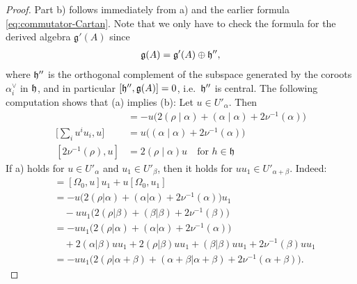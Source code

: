\documentclass[12pt]{article}
\begin{document}
\begin{proof}
    Part b) follows immediately from a) and the earlier formula \ref{eq:commutator-Cartan}. Note that we only have to check the formula for the derived algebra $\mathfrak{g}'(A)$ since \begin{align*}
        \mathfrak{g}(A) = \mathfrak{g}'(A) \oplus \mathfrak{h}'',
    \end{align*} where $\mathfrak{h}''$ is the orthogonal complement of the subspace generated by the coroots $\alpha_i^\vee$ in $\mathfrak{h}$, and in particular $[\mathfrak{h}'',\mathfrak{g}(A)]=0$, i.e.\ $\mathfrak{h}''$ is central.
    The following computation shows that (a) implies (b): Let $u \in U'_\alpha$. Then
    \begin{align*}
        [\Omega_0,u]                & = -u\big(2(\rho \mid \alpha) + (\alpha \mid \alpha) + 2\nu^{-1}(\alpha)\big) \\
        \Big[\sum_i u^i u_i, u\Big] & = u\big((\alpha \mid \alpha) + 2\nu^{-1}(\alpha)\big)                        \\
        [2\nu^{-1}(\rho),u]         & = 2(\rho \mid \alpha)u \quad \text{for } h \in \mathfrak{h}
    \end{align*}
    If a) holds for $u \in U'_\alpha$ and $u_1 \in U'_\beta$, then it holds for $uu_1 \in U'_{\alpha+\beta}$. Indeed:
    \begin{align*}
        [\Omega_0,uu_1] & = [\Omega_0,u]u_1 + u[\Omega_0,u_1]                                                            \\
                        & = -u\big(2(\rho|\alpha) + (\alpha|\alpha) + 2\nu^{-1}(\alpha)\big)u_1                          \\
                        & \quad -uu_1\big(2(\rho|\beta) + (\beta|\beta) + 2\nu^{-1}(\beta)\big)                          \\
                        & = -uu_1\big(2(\rho|\alpha) + (\alpha|\alpha) + 2\nu^{-1}(\alpha)\big)                          \\
                        & \quad + 2(\alpha|\beta)u u_1 + 2(\rho|\beta)uu_1 + (\beta|\beta)uu_1 + 2\nu^{-1}(\beta)uu_1    \\
                        & = -uu_1\big(2(\rho|\alpha+\beta) + (\alpha+\beta|\alpha+\beta) + 2\nu^{-1}(\alpha+\beta)\big).
    \end{align*}


\end{proof}
\end{document}
